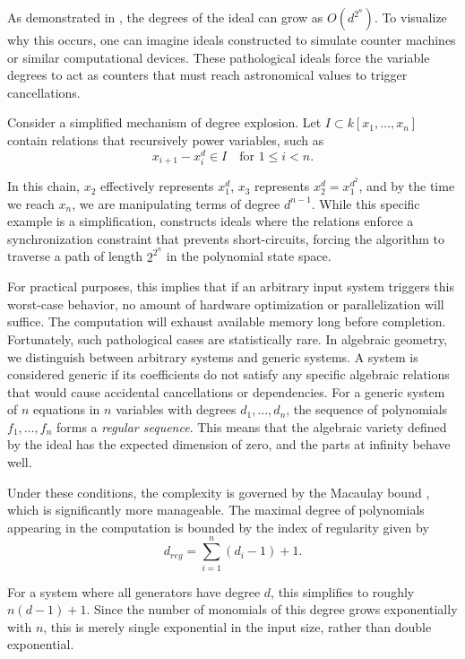 As demonstrated in \cite{Bayer1988_ComplexityOfSyzygies, Koh1998_QuadricsDoubleExp}, the degrees of the ideal can grow as $O(d^{2^n})$. To visualize why this occurs, one can imagine ideals constructed to simulate counter machines or similar computational devices. These pathological ideals force the variable degrees to act as counters that must reach astronomical values to trigger cancellations.

\begin{example}
Consider a simplified mechanism of degree explosion. Let $I \subset k[x_1, \dots, x_n]$ contain relations that recursively power variables, such as
$$
x_{i+1} - x_i^d \in I \quad \text{for } 1 \leq i < n.
$$

In this chain, $x_2$ effectively represents $x_1^d$, $x_3$ represents $x_2^d = x_1^{d^2}$, and by the time we reach $x_n$, we are manipulating terms of degree $d^{n-1}$. While this specific example is a simplification, \cite{Mayr1982_ComplexityWordProblems} constructs ideals where the relations enforce a synchronization constraint that prevents short-circuits, forcing the algorithm to traverse a path of length $2^{2^n}$ in the polynomial state space.
\end{example}

For practical purposes, this implies that if an arbitrary input system triggers this worst-case behavior, no amount of hardware optimization or parallelization will suffice. The computation will exhaust available memory long before completion. Fortunately, such pathological cases are statistically rare. In algebraic geometry, we distinguish between arbitrary systems and generic systems. A system is considered generic if its coefficients do not satisfy any specific algebraic relations that would cause accidental cancellations or dependencies. For a generic system of $n$ equations in $n$ variables with degrees $d_1, \dots, d_n$, the sequence of polynomials $f_1, \dots, f_n$ forms a \textit{regular sequence}. This means that the algebraic variety defined by the ideal has the expected dimension of zero, and the parts at infinity behave well.

Under these conditions, the complexity is governed by the Macaulay bound \cite{MacAulay1927_MacaulayBound,Stanley1975_UpperBoundConjecture}, which is significantly more manageable. The maximal degree of polynomials appearing in the computation is bounded by the index of regularity given by
$$
d_{reg} = \sum_{i=1}^{n} (d_i - 1) + 1.
$$

For a system where all generators have degree $d$, this simplifies to roughly $n(d-1) + 1$. Since the number of monomials of this degree grows exponentially with $n$, this is merely single exponential in the input size, rather than double exponential.

